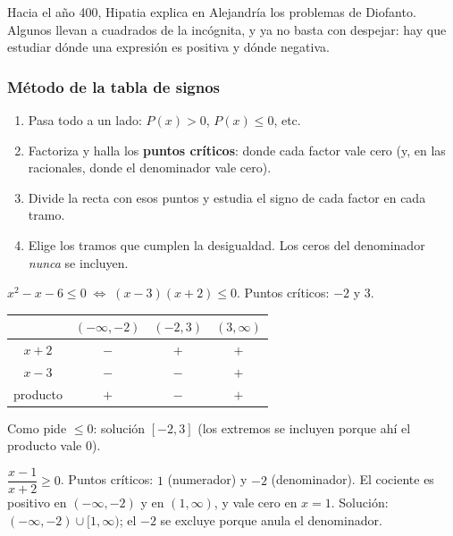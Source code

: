 \documentclass[11pt]{article}
\begin{document}
\label{tema:cuadraticas}

\begin{hilo}
Hacia el año 400, Hipatia explica en Alejandría los problemas de Diofanto. Algunos
llevan a cuadrados de la incógnita, y ya no basta con despejar: hay que estudiar
dónde una expresión es positiva y dónde negativa.
\end{hilo}

\subsubsection*{Método de la tabla de signos}
\begin{enumerate}[label=\arabic*.]
  \item Pasa todo a un lado: $P(x) > 0$, $P(x) \le 0$, etc.
  \item Factoriza y halla los \textbf{puntos críticos}: donde cada factor vale cero
        (y, en las racionales, donde el denominador vale cero).
  \item Divide la recta con esos puntos y estudia el signo de cada factor en cada tramo.
  \item Elige los tramos que cumplen la desigualdad. Los ceros del denominador
        \emph{nunca} se incluyen.
\end{enumerate}

\begin{ejemplo}[Cuadrática]
$x^2 - x - 6 \le 0 \;\Longleftrightarrow\; (x - 3)(x + 2) \le 0$. Puntos críticos:
$-2$ y $3$.
\begin{center}
{\renewcommand{\arraystretch}{1.3}
\begin{tabular}{c|ccc}
  & $(-\infty, -2)$ & $(-2, 3)$ & $(3, \infty)$\\\hline
  $x + 2$ & $-$ & $+$ & $+$\\
  $x - 3$ & $-$ & $-$ & $+$\\\hline
  producto & $+$ & $-$ & $+$\\
\end{tabular}}
\end{center}
Como pide $\le 0$: solución $[-2, 3]$ (los extremos se incluyen porque ahí el
producto vale 0).
\end{ejemplo}

\begin{ejemplo}[Racional]
$\dfrac{x - 1}{x + 2} \ge 0$. Puntos críticos: $1$ (numerador) y $-2$ (denominador).
El cociente es positivo en $(-\infty, -2)$ y en $(1, \infty)$, y vale cero en
$x = 1$. Solución: $(-\infty, -2) \cup [1, \infty)$; el $-2$ se excluye porque
anula el denominador.
\end{ejemplo}
\end{document}
